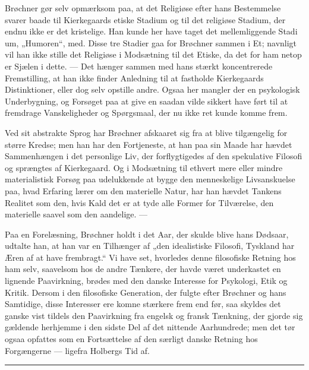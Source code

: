 \documentclass[12pt,a4paper,openany]{book}
\newcommand{\opage}[1]{\marginnote{\footnotesize\textit{[#1]}}}
\begin{document}
Brøchner gør selv opmærksom paa, at det Religiøse efter hans Bestemmelse svarer
baade til Kierkegaards etiske Stadium og til det religiøse Stadium, der endnu
ikke er det kristelige. Han kunde her have taget det mellemliggende Stadi%
\setcounter{footnote}{0}%
\opage{206}um, „Humoren“, med. Disse tre Stadier gaa for Brøchner sammen i Et;
navnligt vil han ikke stille det Religiøse i Modsætning til det Etiske, da det
for ham netop er Sjælen i dette. --- Det hænger sammen med hans stærkt
koncentrerede Fremstilling, at han ikke finder Anledning til at fastholde
Kierkegaards Distinktioner, eller dog selv opstille andre. Ogsaa her mangler
der en psykologisk Underbygning, og Forsøget paa at give en saadan vilde
sikkert have ført til at fremdrage Vanskeligheder og Spørgsmaal, der nu ikke
ret kunde komme frem.

Ved sit abstrakte Sprog har Brøchner afskaaret sig fra at blive tilgængelig for
større Kredse; men han har den Fortjeneste, at han paa sin Maade har hævdet
Sammenhængen i det personlige Liv, der forflygtigedes af den spekulative
Filosofi og sprængtes af Kierkegaard. Og i Modsætning til ethvert mere eller
mindre materialistisk Forsøg paa udelukkende at bygge den menneskelige
Livsanskuelse paa, hvad Erfaring lærer om den materielle Natur, har han hævdet
Tankens Realitet som den, hvis Kald det er at tyde alle Former for Tilværelse,
den materielle saavel som den aandelige. ---

Paa en Forelæsning, Brøchner holdt i det Aar, der skulde blive hans Dødsaar,
udtalte han, at han var en Tilhænger af „den idealistiske Filosofi, Tyskland
har Æren af at have frembragt.“ Vi have set, hvorledes denne filosofiske
Retning hos ham selv, saavelsom hos de andre Tænkere, der havde været
underkastet en lignende Paavirkning, brødes med den danske Interesse for
Psykologi, Etik og Kritik. Dersom i den filosofiske Generation, der fulgte
efter Brøchner og hans Samtidige, disse Interesser ere komne stærkere frem end
før, saa skyldes det ganske vist tildels den Paavirkning fra engelsk og fransk
Tænkning, der gjorde sig gældende herhjemme i den sidste Del af det nittende
Aarhundrede; men det tør ogsaa opfattes som en Fortsættelse af den særligt
danske Retning hos Forgængerne --- ligefra Holbergs Tid af.

\begin{center}\rule{2cm}{0.4pt}\end{center}
\end{document}
